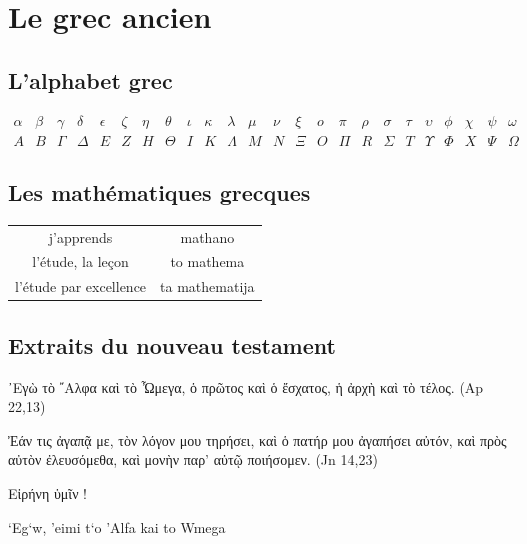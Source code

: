 \section{Le grec ancien}
\subsection{L'alphabet grec}
\[
\begin{array}{cccccccccccccccccccccccc}
 \alpha & \beta &\gamma &  \delta & \epsilon & \zeta & \eta &\theta & \iota &\kappa &\lambda & \mu & \nu & \xi & o & \pi & \rho & \sigma & \tau & 
 \upsilon & \phi & \chi & \psi & \omega \\
 A & B & \Gamma & \Delta & E & Z & H & \Theta & I & K & \Lambda & M & N  &\Xi & O & \Pi & R & \Sigma & T & \Upsilon & \Phi & X & \Psi & \Omega
 \end{array}
 \]

\subsection{Les mathématiques grecques}
\begin{tabular}{c | c}
 j'apprends & \textgreek{mathano} \\
 l'étude, la leçon & \textgreek{to mathema} \\
 l'étude par excellence & \textgreek{ta mathematija} \\
\end{tabular}

\subsection{Extraits du nouveau testament}
 \begin{center}
\end{center}

\vspace{1cm}

 \textgreek{	
᾿Εγὼ τὸ ῎Αλφα καὶ τὸ Ὦμεγα, ὁ πρῶτος καὶ ὁ ἔσχατος, ἡ ἀρχὴ καὶ τὸ τέλος.} (Ap 22,13)

 \textgreek{Ἐάν τις ἀγαπᾷ με, τὸν λόγον μου τηρήσει, καὶ ὁ πατήρ μου ἀγαπήσει αὐτόν,
  καὶ πρὸς αὐτὸν ἐλευσόμεθα, καὶ μονὴν παρ’ αὐτῷ ποιήσομεν.} (Jn 14,23)

 \textgreek{	
Εἰρήνη ὑμῖν !}


\textgreek{`Eg`w, 'eimi t`o 'Alfa kai to Wmega}
